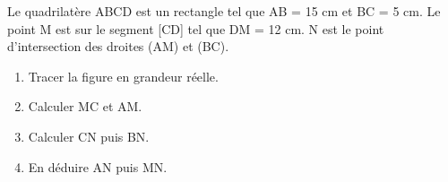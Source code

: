 \documentclass[exercice]{thedocument}%
\begin{document}
%
Le quadrilatère ABCD est un rectangle tel que AB = 15 cm et BC = 5 cm. Le point
M est sur le segment [CD] tel que DM = 12 cm. N est le point d'intersection des
droites (AM) et (BC).
\begin{enumerate}
    \item Tracer la figure en grandeur réelle.
    \item Calculer MC et AM.
    \item Calculer CN puis BN.
    \item En déduire AN puis MN.
\end{enumerate}
\end{document}
